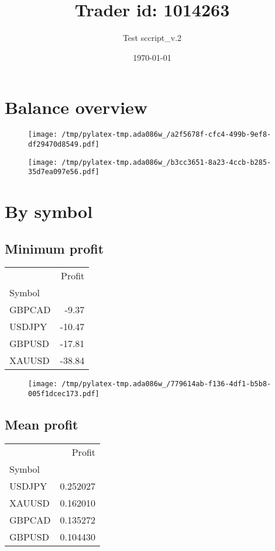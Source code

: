 \documentclass{article}%
\title{Trader id: 1014263}%
\author{Test sccript\_v.2}%
\date{\today}%
\begin{document}
%
\normalsize%
\maketitle%
\section{Balance overview}%
\label{sec:Balanceoverview}%


\begin{figure}[htbp]%
\centering%
\texttt{[image: /tmp/pylatex-tmp.ada086w\_/a2f5678f-cfc4-499b-9ef8-df29470d8549.pdf]}%
\end{figure}

%


\begin{figure}[htbp]%
\centering%
\texttt{[image: /tmp/pylatex-tmp.ada086w\_/b3cc3651-8a23-4ccb-b285-35d7ea097e56.pdf]}%
\end{figure}

%
\section{By symbol}%
\label{sec:Bysymbol}%
\subsection{Minimum profit }%
\label{subsec:Minimumprofit}%
\begin{tabular}{lr}
\toprule
{} &  Profit \\
Symbol &         \\
\midrule
GBPCAD &   -9.37 \\
USDJPY &  -10.47 \\
GBPUSD &  -17.81 \\
XAUUSD &  -38.84 \\
\bottomrule
\end{tabular}
%


\begin{figure}[htbp]%
\centering%
\texttt{[image: /tmp/pylatex-tmp.ada086w\_/779614ab-f136-4df1-b5b8-005f1dcec173.pdf]}%
\end{figure}

%
\newpage %
\subsection{Mean profit }%
\label{subsec:Meanprofit}%
\begin{tabular}{lr}
\toprule
{} &    Profit \\
Symbol &           \\
\midrule
USDJPY &  0.252027 \\
XAUUSD &  0.162010 \\
GBPCAD &  0.135272 \\
GBPUSD &  0.104430 \\
\bottomrule
\end{tabular}
%
\end{document}
